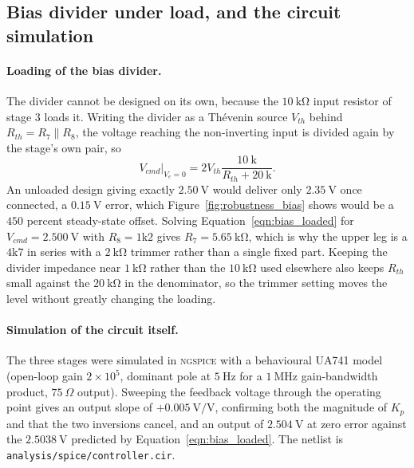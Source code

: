 \subsection{Bias divider under load, and the circuit simulation}
\paragraph{Loading of the bias divider.} The divider cannot be designed on its own, because the
$10\ \mathrm{k\Omega}$ input resistor of stage 3 loads it. Writing the divider as a Th\'evenin
source $V_{th}$ behind $R_{th} = R_7 \parallel R_8$, the voltage reaching the non-inverting input
is divided again by the stage's own pair, so
\begin{equation}\label{eqn:bias_loaded}
    V_{cmd}\big|_{V_e = 0} = 2 V_{th}\frac{10\ \mathrm{k}}{R_{th} + 20\ \mathrm{k}} .
\end{equation}
An unloaded design giving exactly $2.50\ \mathrm{V}$ would deliver only $2.35\ \mathrm{V}$ once
connected, a $0.15\ \mathrm{V}$ error, which Figure~\ref{fig:robustness_bias} shows would be a
$450$ percent steady-state offset. Solving Equation~\eqref{eqn:bias_loaded} for
$V_{cmd} = 2.500\ \mathrm{V}$ with $R_8 = 1\mathrm{k}2$ gives $R_7 = 5.65\ \mathrm{k\Omega}$,
which is why the upper leg is a $4\mathrm{k}7$ in series with a $2\ \mathrm{k\Omega}$ trimmer
rather than a single fixed part. Keeping the divider impedance near $1\ \mathrm{k\Omega}$ rather
than the $10\ \mathrm{k\Omega}$ used elsewhere also keeps $R_{th}$ small against the
$20\ \mathrm{k\Omega}$ in the denominator, so the trimmer setting moves the level without greatly
changing the loading.

\paragraph{Simulation of the circuit itself.} The three stages were simulated in \textsc{ngspice}
with a behavioural UA741 model (open-loop gain $2\times 10^5$, dominant pole at $5\ \mathrm{Hz}$
for a $1\ \mathrm{MHz}$ gain-bandwidth product, $75\ \Omega$ output). Sweeping the feedback
voltage through the operating point gives an output slope of $+0.005\ \mathrm{V/V}$, confirming
both the magnitude of $K_p$ and that the two inversions cancel, and an output of
$2.504\ \mathrm{V}$ at zero error against the $2.5038\ \mathrm{V}$ predicted by
Equation~\eqref{eqn:bias_loaded}. The netlist is \texttt{analysis/spice/controller.cir}.

